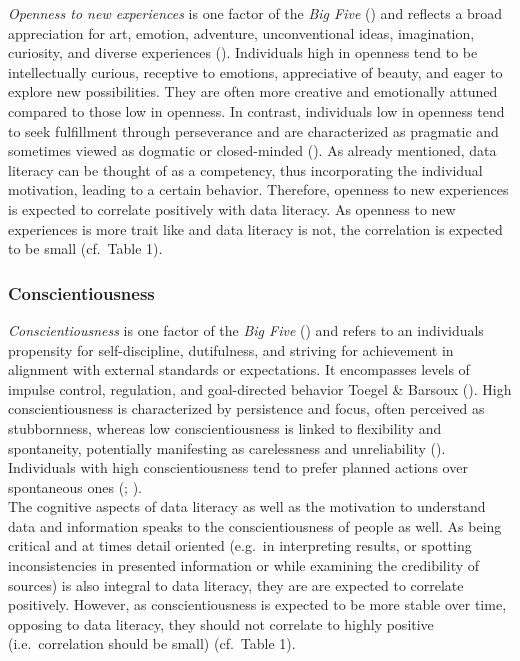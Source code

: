 \documentclass[
  12pt,
  a4paper,
  twoside]{article}
\begin{document}
\emph{Openness to new experiences} is one factor of the \emph{Big Five} () and reflects a broad appreciation for art, emotion, adventure, unconventional ideas, imagination, curiosity, and diverse experiences (). Individuals high in openness tend to be intellectually curious, receptive to emotions, appreciative of beauty, and eager to explore new possibilities. They are often more creative and emotionally attuned compared to those low in openness. In contrast, individuals low in openness tend to seek fulfillment through perseverance and are characterized as pragmatic and sometimes viewed as dogmatic or closed-minded (). As already mentioned, data literacy can be thought of as a competency, thus incorporating the individual motivation, leading to a certain behavior. Therefore, openness to new experiences is expected to correlate positively with data literacy. As openness to new experiences is more trait like and data literacy is not, the correlation is expected to be small (cf.~Table 1).

\subsubsection{Conscientiousness}\label{conscientiousness}

\emph{Conscientiousness} is one factor of the \emph{Big Five} () and refers to an individuals propensity for self-discipline, dutifulness, and striving for achievement in alignment with external standards or expectations. It encompasses levels of impulse control, regulation, and goal-directed behavior Toegel \& Barsoux (). High conscientiousness is characterized by persistence and focus, often perceived as stubbornness, whereas low conscientiousness is linked to flexibility and spontaneity, potentially manifesting as carelessness and unreliability (). Individuals with high conscientiousness tend to prefer planned actions over spontaneous ones (; ).\\
The cognitive aspects of data literacy as well as the motivation to understand data and information speaks to the conscientiousness of people as well. As being critical and at times detail oriented (e.g.~in interpreting results, or spotting inconsistencies in presented information or while examining the credibility of sources) is also integral to data literacy, they are are expected to correlate positively. However, as conscientiousness is expected to be more stable over time, opposing to data literacy, they should not correlate to highly positive (i.e.~correlation should be small) (cf.~Table 1).
\end{document}
